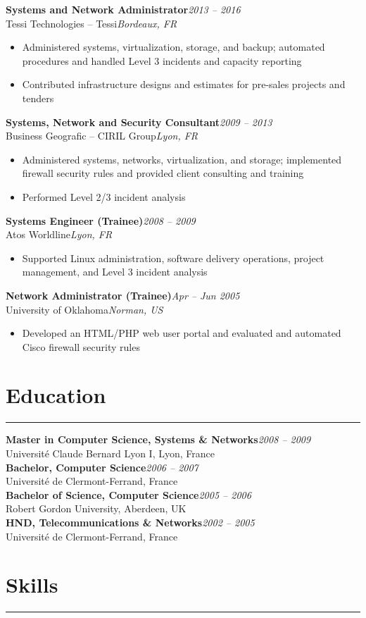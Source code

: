\documentclass[10pt,a4paper]{article}
\newcommand{\jobseparator}{\vspace{0.45em}}
\newcommand{\sectionrule}{\noindent\rule{\linewidth}{0.4pt}\par\vspace{0.24em}}
\newcommand{\job}[6]{%
  {\textbf{#1}}\hfill{\textit{#2}}\\
  {#3}\hfill{\textit{#4}}\\
  \begin{itemize}
    #5
  \end{itemize}
}
\newcommand{\edu}[4]{%
  {\textbf{#1}}\hfill{\textit{#2}}\\
  {#3}\\
}
\begin{document}
\job{Systems and Network Administrator}{2013 -- 2016}{Tessi Technologies -- Tessi}{Bordeaux, FR}{
  \item Administered systems, virtualization, storage, and backup; automated procedures and handled Level 3 incidents and capacity reporting
  \item Contributed infrastructure designs and estimates for pre-sales projects and tenders
}{ }
\jobseparator

\job{Systems, Network and Security Consultant}{2009 -- 2013}{Business Geografic -- CIRIL Group}{Lyon, FR}{
  \item Administered systems, networks, virtualization, and storage; implemented firewall security rules and provided client consulting and training
  \item Performed Level 2/3 incident analysis
}{ }
\jobseparator

\job{Systems Engineer (Trainee)}{2008 -- 2009}{Atos Worldline}{Lyon, FR}{
  \item Supported Linux administration, software delivery operations, project management, and Level 3 incident analysis
}{ }
\jobseparator

\job{Network Administrator (Trainee)}{Apr -- Jun 2005}{University of Oklahoma}{Norman, US}{
  \item Developed an HTML/PHP web user portal and evaluated and automated Cisco firewall security rules
}{ }

\section*{Education}
\sectionrule

\edu{Master in Computer Science, Systems \& Networks}{2008 -- 2009}{Université Claude Bernard Lyon I, Lyon, France}{}
\edu{Bachelor, Computer Science}{2006 -- 2007}{Université de Clermont-Ferrand, France}{}
\edu{Bachelor of Science, Computer Science}{2005 -- 2006}{Robert Gordon University, Aberdeen, UK}{}
\edu{HND, Telecommunications \& Networks}{2002 -- 2005}{Université de Clermont-Ferrand, France}{}

\section*{Skills}
\sectionrule
\end{document}
